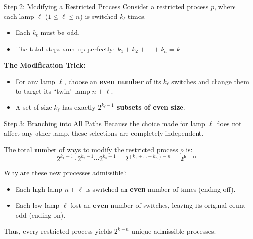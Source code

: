 \documentclass[10pt]{beamer}
\begin{document}
\begin{frame}{Step 2: Modifying a Restricted Process}
Consider a restricted process $p$, where each lamp $\ell$ ($1 \le \ell \le n$) is switched $k_\ell$ times. 
\begin{itemize}
    \item Each $k_\ell$ must be odd.
    \item The total steps sum up perfectly: $k_1 + k_2 + \dots + k_n = k$.
\end{itemize}

\pause
\vspace{0.2cm}
\textbf{The Modification Trick:}
\begin{itemize}
    \item For any lamp $\ell$, choose an \textbf{even number} of its $k_\ell$ switches and change them to target its ``twin'' lamp $n+\ell$.
    \item A set of size $k_\ell$ has exactly \textbf{$2^{k_\ell-1}$ subsets of even size}.
\end{itemize}
\end{frame}

\begin{frame}{Step 3: Branching into All Paths}
Because the choice made for lamp $\ell$ does not affect any other lamp, these selections are completely independent.

\vspace{0.3cm}
The total number of ways to modify the restricted process $p$ is:
\[
2^{k_1-1} \cdot 2^{k_2-1} \cdots 2^{k_n-1} = 2^{(k_1 + \dots + k_n) - n} = \mathbf{2^{k-n}}
\]

\pause
\begin{block}{Why are these new processes admissible?}
\begin{itemize}
    \item Each high lamp $n+\ell$ is switched an \textbf{even} number of times (ending off).
    \item Each low lamp $\ell$ lost an \textbf{even} number of switches, leaving its original count odd (ending on).
\end{itemize}
Thus, every restricted process yields $2^{k-n}$ unique admissible processes.
\end{block}
\end{frame}
\end{document}
